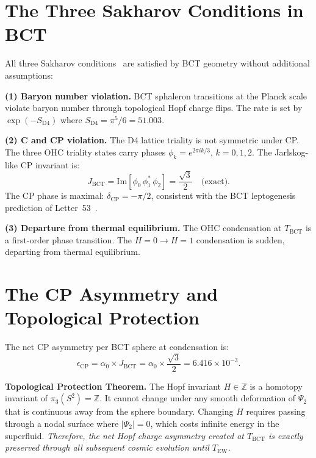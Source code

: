 \documentclass[aps,prl,twocolumn,superscriptaddress,showpacs]{revtex4-2}
\begin{document}
\section{The Three Sakharov Conditions in BCT}

All three Sakharov conditions~\cite{Sakharov1967} are satisfied by BCT geometry 
without additional assumptions:

\textbf{(1) Baryon number violation.} BCT sphaleron transitions at the Planck 
scale violate baryon number through topological Hopf charge flips. The rate is 
set by $\exp(-S_\mathrm{D4})$ where $S_\mathrm{D4} = \pi^5/6 = 51.003$.

\textbf{(2) C and CP violation.} The D4 lattice triality is not symmetric under 
CP. The three OHC triality states carry phases $\phi_k = e^{2\pi i k/3}$, $k=0,1,2$. 
The Jarlskog-like CP invariant is:
\begin{equation}
J_\mathrm{BCT} = \mathrm{Im}[\phi_0\,\phi_1^*\,\phi_2] = \frac{\sqrt{3}}{2}
\quad\text{(exact).}
\end{equation}
The CP phase is maximal: $\delta_\mathrm{CP} = -\pi/2$, consistent with the 
BCT leptogenesis prediction of Letter~53~\cite{BCT_L53}.

\textbf{(3) Departure from thermal equilibrium.} The OHC condensation at 
$T_\mathrm{BCT}$ is a first-order phase transition. The $H=0 \to H=1$ 
condensation is sudden, departing from thermal equilibrium.

\section{The CP Asymmetry and Topological Protection}

The net CP asymmetry per BCT sphere at condensation is:
\begin{equation}
\epsilon_\mathrm{CP} = \alpha_0 \times J_\mathrm{BCT} 
= \alpha_0 \times \frac{\sqrt{3}}{2} = 6.416\times 10^{-3}.
\end{equation}

\textbf{Topological Protection Theorem.} The Hopf invariant $H \in \mathbb{Z}$ 
is a homotopy invariant of $\pi_3(S^2) = \mathbb{Z}$. It cannot change under 
any smooth deformation of $\Psi_2$ that is continuous away from the sphere 
boundary. Changing $H$ requires passing through a nodal surface where 
$|\Psi_2| = 0$, which costs infinite energy in the superfluid. 
\emph{Therefore, the net Hopf charge asymmetry created at $T_\mathrm{BCT}$ 
is exactly preserved through all subsequent cosmic evolution until $T_\mathrm{EW}$.}
\end{document}

